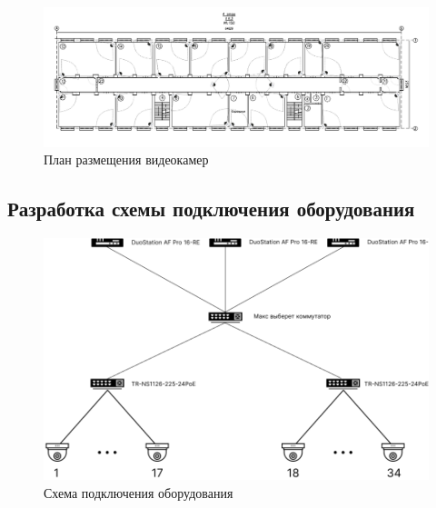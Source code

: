 \begin{figure}
    \begin{center}
        \includegraphics[width=240mm]{images/План размещения видеокамер}
    \end{center}
    \captionsetup{justification=centering}
    \caption{План размещения видеокамер}
    \label{fig::videocameras_placement}
\end{figure}


\subsection{Разработка схемы подключения оборудования}

\begin{figure}[h]
    \begin{center}
        \includegraphics[width=160mm]{images/Схема подключения оборудования}
    \end{center}
    \captionsetup{justification=centering}
    \caption{Схема подключения оборудования}
    \label{fig::connections}
\end{figure}
